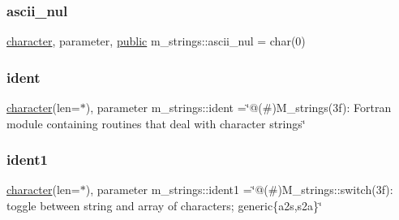 \mbox{\label{namespacem__strings_a9de5098e31c6411a43323b1d7f19a886}} 
\subsubsection{\texorpdfstring{ascii\+\_\+nul}{ascii\_nul}}
{\footnotesize\ttfamily \hyperlink{option__stopwatch_83_8txt_abd4b21fbbd175834027b5224bfe97e66}{character}, parameter, \hyperlink{M__stopwatch_83_8txt_a2f74811300c361e53b430611a7d1769f}{public} m\+\_\+strings\+::ascii\+\_\+nul = char(0)}

\mbox{\label{namespacem__strings_a1a9ef3b9018fa526c23873b95f53768f}} 
\subsubsection{\texorpdfstring{ident}{ident}}
{\footnotesize\ttfamily \hyperlink{option__stopwatch_83_8txt_abd4b21fbbd175834027b5224bfe97e66}{character}(len=$\ast$), parameter m\+\_\+strings\+::ident =\char`\"{}@(\#)M\+\_\+strings(3f)\+: Fortran module containing routines that deal with character strings\char`\"{}}

\mbox{\label{namespacem__strings_a13ee1b22ec4a8cb9c2137864495421d3}} 
\subsubsection{\texorpdfstring{ident1}{ident1}}
{\footnotesize\ttfamily \hyperlink{option__stopwatch_83_8txt_abd4b21fbbd175834027b5224bfe97e66}{character}(len=$\ast$), parameter m\+\_\+strings\+::ident1 =\char`\"{}@(\#)M\+\_\+strings\+::switch(3f)\+: toggle between string and array of characters; generic\{a2s,s2a\}\char`\"{}\hspace{0.3cm}{\ttfamily [private]}}

\mbox{\label{namespacem__strings_ab6570916910af932896de93e4792cf46}} 
